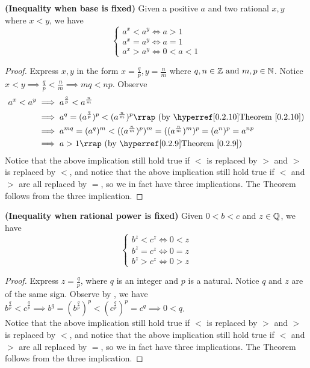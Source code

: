 \documentclass{report}
\begin{document}
\begin{theorem}
\label{1.3.10}
\textbf{(Inequality when base is fixed)} Given a positive $a$ and two rational  $x,y$ where  $x<y$, we have
 \begin{equation}
\begin{cases}
  a^x<a^y\iff a>1\\
  a^x=a^y\iff a=1\\
  a^x>a^y\iff 0<a<1
\end{cases}
\end{equation}
\end{theorem}
\begin{proof}
  Express $x,y$ in the form $x=\frac{q}{p},y=\frac{n}{m}$ where $q,n\in\mathbb{Z}\text{ and }m,p\in\mathbb{N}$. Notice $x<y\implies \frac{q}{p}<\frac{n}{m}\implies mq<np$. Observe
  \begin{align}
    a^x<a^y &\implies a^{\frac{q}{p}}<a^{\frac{n}{m}}\\
  &\implies a^q=(a^{\frac{q}{p}})^p<(a^{\frac{n}{m}})^p\rap{by \myref{Theorem}{0.2.10}}\\
  &\implies a^{mq}=(a^q)^m<((a^{\frac{n}{m}})^p)^m=((a^{\frac{n}{m}})^m)^p=(a^n)^p=a^{np}\\
  &\implies a>1\rap{by \myref{Theorem}{0.2.9}} 
  \end{align}
  Notice that the above implication still hold true if $<$ is replaced by $>$ and $>$ is replaced by  $<$, and notice that the above implication still hold true if $<$ and  $>$ are all replaced by $=$, so we in fact have three implications. The Theorem follows from the three implication.
   
\end{proof}
\begin{theorem}
\label{1.3.11}
\textbf{(Inequality when rational power is fixed)} Given $0<b<c$ and  $z\in\mathbb{Q}$, we have
\begin{equation}
\begin{cases}
  b^z<c^z \iff 0<z\\
  b^z=c^z \iff 0=z\\
  b^z>c^z\iff 0>z
\end{cases}
\end{equation}
\end{theorem}
\begin{proof}
Express $z=\frac{q}{p}$, where $q$ is an integer and $p$ is a natural. Notice $q\text{ and }z$ are of the same sign. Observe by , we have $b^{\frac{q}{p}}<c^{\frac{q}{p}}\implies b^q=(b^{\frac{q}{p}})^p<(c^{\frac{q}{p}})^p=c^q\implies 0<q$.\\

  Notice that the above implication still hold true if $<$ is replaced by $>$ and $>$ is replaced by  $<$, and notice that the above implication still hold true if $<$ and  $>$ are all replaced by $=$, so we in fact have three implications. The Theorem follows from the three implication.
\end{proof}
\end{document}
